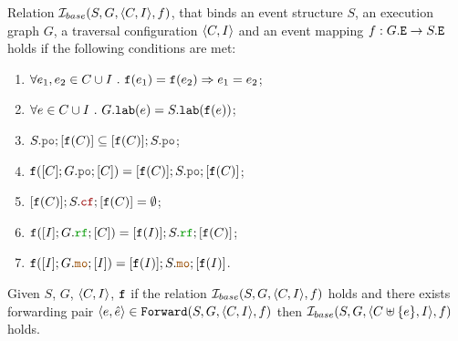 \documentclass[12pt]{article}
\begin{document}
\begin{definition}
  Relation $\mathcal{I}_{base}(S, G, \langle C, I \rangle, f)$, that binds an 
  event structure $S$, an \imm execution graph $G$,
  a traversal configuration $\langle C, I \rangle$
  and an event mapping $f : G.{\mathtt{E}} \rightarrow S.{\mathtt{E}}$ 
  holds if the following conditions are met:
  \begin{enumerate}[label=\textbf{S.\arabic*}]

    \item \label{item:sim-inj}
      $\forall{e_1, e_2 \in C \cup I} ~.~ {\mathtt{f}}(e_1) = {\mathtt{f}}(e_2) \Rightarrow e_1 = e_2$;

    \item \label{item:sim-lab}
      $\forall{e \in C \cup I} ~.~ G.{\mathtt{lab}}(e) = S.{\mathtt{lab}}({\mathtt{f}}(e))$;

    \item \label{item:sim-po-prfx} 
      $S.\lPO;[\lf(C)] \subseteq [\lf(C)];S.\lPO$;

    \item \label{item:sim-po}
      $\lf([C];G.\lPO;[C]) = [\lf(C)];S.\lPO;[\lf(C)]$;
    
    \item \label{item:sim-cf}
      $[\lf(C)];S.\lCF;[\lf(C)] = \emptyset$;

    \item \label{item:sim-rf}
      $\lf([I];G.\lRF;[C]) = [\lf(I)];S.\lRF;[\lf(C)]$;

    \item \label{item:sim-mo}
      $\lf([I];G.\lMO;[I]) = [\lf(I)];S.\lMO;[\lf(I)]$.
    
  \end{enumerate}
\end{definition}

\begin{lemma}
  \label{lemma:sim-forward}
  Given $S$, $G$, $\langle C, I \rangle$, ${\mathtt{f}}$
  if the relation $\mathcal{I}_{base}(S, G, \langle C, I \rangle, f)$ holds and 
  there exists forwarding pair $\langle e, \hat{e} \rangle \in {\mathtt{Forward}}(S, G, \langle C, I \rangle, f)$
  then $\mathcal{I}_{base}(S, G, \langle C \uplus \{e\}, I \rangle, f)$ holds. 
\end{lemma}
\end{document}
